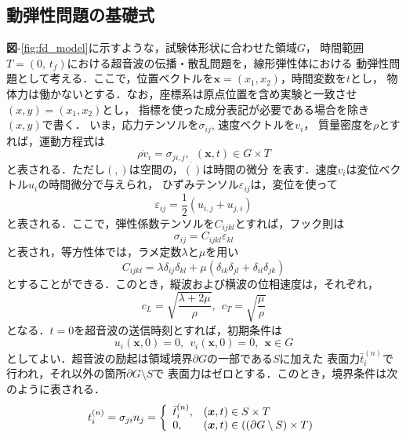 \subsection{動弾性問題の基礎式}
{\bf 図}-\ref{fig:fd_model}に示すような，試験体形状に合わせた領域$G$，
時間範囲$T=(0,\, t_f)$における超音波の伝播・散乱問題を，線形弾性体における
動弾性問題として考える．ここで，位置ベクトルを$\boldsymbol{x}=(x_1,x_2)$，時間変数を$t$とし，
物体力は働かないとする．なお，座標系は原点位置を含め実験と一致させ$(x,y)=(x_1,x_2)$とし，
指標を使った成分表記が必要である場合を除き$(x,y)$で書く．
いま，応力テンソルを$\sigma_{ij}$, 速度ベクトルを$v_i$，
質量密度を$\rho$とすれば，運動方程式は
\begin{equation}
	\rho \dot{v}_i=\sigma_{ji,j}, \ \ (\boldsymbol{x},t)\in G\times T
	\label{eqn:}
\end{equation}
と表される．ただし$(,)$は空間の，$\dot{()}$は時間の微分
を表す．速度$v_i$は変位ベクトル$u_i$の時間微分で与えられ，
ひずみテンソル$\varepsilon_{ij}$は，変位を使って
\begin{equation}
	\varepsilon_{ij}=\frac{1}{2}(u_{i,j}+u_{j,i})
	\label{eqn:FWD}
\end{equation}
と表される．ここで，弾性係数テンソルを$C_{ijkl}$とすれば，フック則は
\begin{equation}
	\sigma_{ij}=C_{ijkl}\varepsilon_{kl}
	\label{eqn:}
\end{equation}
と表され，等方性体では，ラメ定数$\lambda$と$\mu$を用い
\begin{equation}
	C_{ijkl}=\lambda \delta_{ij}\delta_{kl} +
	\mu (
	\delta_{ik}\delta_{jl}
	+
	\delta_{il}\delta_{jk} 
	)
	\label{eqn:Cijkl_iso}
\end{equation}
とすることができる．このとき，縦波および横波の位相速度は，それぞれ，
\begin{equation}
	c_{L}=\sqrt{\frac{\lambda + 2\mu}{\rho}}
	, \ \ 
	c_{T}=\sqrt{\frac{\mu}{\rho}}
	\label{eqn:}
\end{equation}
となる．$t=0$を超音波の送信時刻とすれば，初期条件は
\begin{equation}
	u_i(\boldsymbol{x},0)=0, 
\ \ v_i(\boldsymbol{x},0)=0, 
\ \ \boldsymbol{x} \in G
	\label{eqn:IC}
\end{equation}
としてよい．超音波の励起は領域境界$\partial G$の一部である$S$に加えた
表面力$\bar{t}_i^{(n)}$で行われ，それ以外の箇所$\partial G\setminus S$で
表面力はゼロとする．このとき，境界条件は次のように表される．
\begin{equation}
	t_i^{(n)} = \sigma_{ji}n_j=
	\left\{
		\begin{array}{ll}	
			\bar{t}^{(n)}_i, & (\boldsymbol{x},t)\in S\times T \\
			0,  & (\boldsymbol{x},t)\in \left( (\partial G \setminus S)\times T\right) 
		\end{array}
	\right.
	\label{eqn:BC}
\end{equation}
